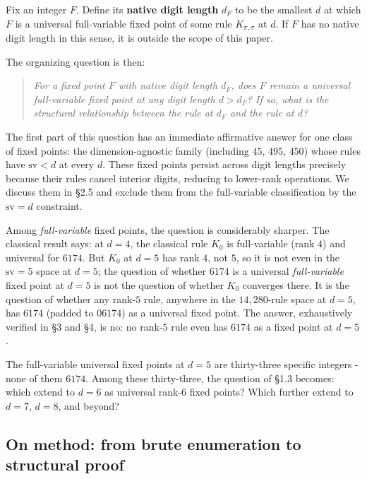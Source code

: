 \documentclass[11pt,letterpaper]{article}
\theoremstyle{paperstyle}
\theoremstyle{paperstyledef}
\theoremstyle{paperstylerem}
\begin{document}
Fix an integer \(F\). Define its \textbf{native digit length} \(d_F\) to
be the smallest \(d\) at which \(F\) is a universal full-variable fixed
point of some rule \(K_{\pi, \sigma}\) at \(d\). If \(F\) has no native
digit length in this sense, it is outside the scope of this paper.

The organizing question is then:

\begin{quote}
\emph{For a fixed point \(F\) with native digit length \(d_F\), does
\(F\) remain a universal full-variable fixed point at any digit length
\(d > d_F\)? If so, what is the structural relationship between the rule
at \(d_F\) and the rule at \(d\)?}
\end{quote}

The first part of this question has an immediate affirmative answer for
one class of fixed points: the dimension-agnostic family (including
\(45\), \(495\), \(450\)) whose rules have \(\mathrm{sv} < d\) at every
\(d\). These fixed points persist across digit lengths precisely because
their rules cancel interior digits, reducing to lower-rank operations.
We discuss them in §2.5 and exclude them from the full-variable
classification by the \(\mathrm{sv} = d\) constraint.

Among \emph{full-variable} fixed points, the question is considerably
sharper. The classical result says: at \(d = 4\), the classical rule
\(K_0\) is full-variable (rank \(4\)) and universal for \(6174\). But
\(K_0\) at \(d = 5\) has rank \(4\), not \(5\), so it is not even in the
\(\mathrm{sv} = 5\) space at \(d = 5\); the question of whether \(6174\)
is a universal \emph{full-variable} fixed point at \(d = 5\) is not the
question of whether \(K_0\) converges there. It is the question of
whether any rank-\(5\) rule, anywhere in the \(14{,}280\)-rule space at
\(d = 5\), has \(6174\) (padded to \(06174\)) as a universal fixed
point. The answer, exhaustively verified in §3 and §4, is no: no
rank-\(5\) rule even has \(6174\) as a fixed point at \(d = 5\).

The full-variable universal fixed points at \(d = 5\) are thirty-three
specific integers - none of them \(6174\). Among these thirty-three,
the question of §1.3 becomes: which extend to \(d = 6\) as universal
rank-\(6\) fixed points? Which further extend to \(d = 7\), \(d = 8\),
and beyond?

\hypertarget{on-method-from-brute-enumeration-to-structural-proof}{%
\subsection{On method: from brute enumeration to structural proof}\label{on-method-from-brute-enumeration-to-structural-proof}}
\end{document}
